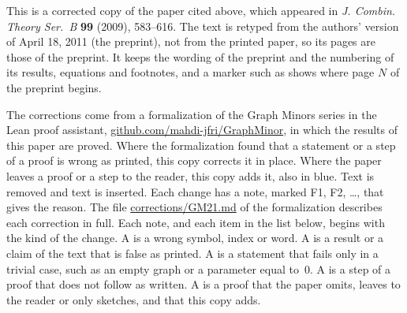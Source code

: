 
This is a corrected copy of the paper cited above, which appeared in \textit{J. Combin. Theory
Ser.~B} \textbf{99} (2009), 583--616. The text is retyped from the authors' version of April 18,
2011 (the preprint), not from the printed paper, so its pages are those of the preprint. It keeps
the wording of the preprint and the numbering of its results, equations and footnotes, and a
marker such as  shows where page $N$ of the preprint begins.

The corrections come from a formalization of the Graph Minors series in the Lean proof
assistant, \href{https://github.com/mahdi-jfri/GraphMinor}{github.com/mahdi-jfri/GraphMinor},
in which the results of this paper are proved. Where the formalization found that a statement
or a step of a proof is wrong as printed, this copy corrects it in place. Where the paper leaves a proof or a step to the reader, this copy adds it, also in blue. Text  is removed and text  is inserted. Each change has a note, marked
\textcolor{fixcolor}{\sffamily F1}, \textcolor{fixcolor}{\sffamily F2}, \dots, that gives the
reason. The file
\href{https://github.com/mahdi-jfri/GraphMinor/blob/main/corrections/GM21.md}{corrections/GM21.md}
of the formalization describes each correction in full. Each note, and each item in the list below, begins with the kind of the change. A  is a wrong symbol, index or word. A  is a result or a claim of the text that is false as printed. A  is a statement that fails only in a trivial case, such as an empty graph or a parameter equal to~$0$. A  is a step of a proof that does not follow as written. A  is a proof that the paper omits, leaves to the reader or only sketches, and that this copy adds.

